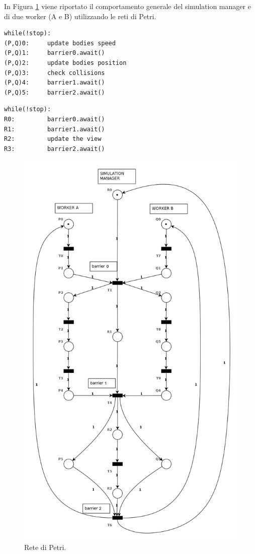 \documentclass[12pt,a4paper,openright,twoside]{book}
\begin{document}
In Figura \ref{fig:petri-net} viene riportato il comportamento generale del simulation manager e di due worker (A e B) utilizzando 
le reti di Petri.
\begin{lstlisting}[label=lst:worker,caption=pseudocodice del worker]
		while(!stop):
(P,Q)0:		update bodies speed
(P,Q)1:		barrier0.await()
(P,Q)2:		update bodies position
(P,Q)3:		check collisions
(P,Q)4:		barrier1.await()
(P,Q)5:		barrier2.await()
\end{lstlisting}

\begin{lstlisting}[label=lst:simulation_manager,caption=pseudocodice del simulation manager]
		while(!stop):
R0:			barrier0.await()
R1:			barrier1.await()
R2:			update the view
R3:			barrier2.await()
\end{lstlisting}

\begin{figure}
	\centering
	\includegraphics[width=0.9\linewidth]{figures/petri-net.png}
	\caption{Rete di Petri.}
	\label{fig:petri-net}
\end{figure}
\end{document}
